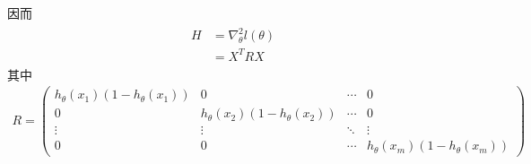 因而
\begin{eqnarray}
\begin{aligned}
H&=\nabla_\theta^2l(\theta)\\
&= X^TRX
\end{aligned}
\end{eqnarray}
其中
\begin{eqnarray}
R=
\begin{pmatrix}
h_\theta(x_1)(1-h_\theta(x_1)) & 0 &\cdots & 0\\
0 & h_\theta(x_2)(1-h_\theta(x_2)) & \cdots & 0\\
\vdots & \vdots & \ddots & \vdots\\
0 & 0 & \cdots & h_\theta(x_m)(1-h_\theta(x_m))
\end{pmatrix}
\end{eqnarray}